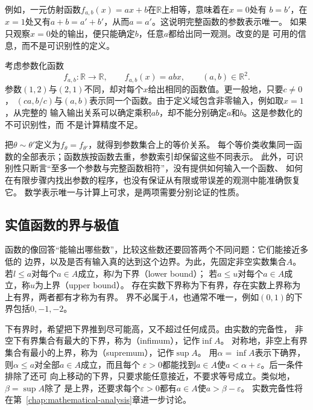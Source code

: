 例如，一元仿射函数$f_{a,b}(x)=ax+b$在$\mathbb{R}$上相等，意味着在$x=0$处有
$b=b'$，在$x=1$处又有$a+b=a'+b'$，从而$a=a'$。这说明完整函数的参数表示唯一。
如果只观察$x=0$处的输出，便只能确定$b$，任意$a$都给出同一观测。改变的是
可用的信息，而不是可识别性的定义。

\begin{example}[参数不同而函数相同]
\label{ex:prelim-nonidentifiable-parameterization}
考虑参数化函数
\[
  f_{a,b}:\mathbb{R}\to\mathbb{R},
  \qquad
  f_{a,b}(x)=abx,
  \qquad
  (a,b)\in\mathbb{R}^2.
\]
参数$(1,2)$与$(2,1)$不同，却对每个$x$给出相同的函数值。更一般地，只要$c\neq0$，
$(ca,b/c)$与$(a,b)$表示同一个函数。由于定义域包含非零输入，例如取$x=1$，从完整的
输入输出关系可以确定乘积$ab$，却不能分别确定$a$和$b$。这是参数化的不可识别性，而
不是计算精度不足。
\end{example}

把$\theta\sim\theta'$定义为$f_\theta=f_{\theta'}$，就得到参数集合上的等价关系。
每个等价类收集同一函数的全部表示；函数族按函数去重，参数索引却保留这些不同表示。
此外，可识别性只断言“至多一个参数与完整函数相符”，没有提供如何输入一个函数、
如何在有限步骤内找出参数的程序，也没有保证从有限或带误差的观测中能准确恢复它。
数学表示唯一与计算上可求，是两项需要分别论证的性质。

\subsection{实值函数的界与极值}
\label{sec:prelim-optimal-values-errors}

函数的像回答“能输出哪些数”，比较这些数还要回答两个不同问题：它们能接近多低的
边界，以及是否有输入真的达到这个边界。为此，先固定非空实数集合$A$。
若$l\leq a$对每个$a\in A$成立，称$l$为下界（lower bound）；
若$a\leq u$对每个$a\in A$成立，称$u$为上界（upper bound）。
存在实数下界称为下有界，存在实数上界称为上有界，两者都有才称为有界。
界不必属于$A$，也通常不唯一，例如$(0,1)$的下界包括$0,-1,-2$。

下有界时，希望把下界推到尽可能高，又不超过任何成员。由实数的完备性，
非空下有界集合有最大的下界，称为（infimum），记作$\inf A$。
对称地，非空上有界集合有最小的上界，称为（supremum），记作$\sup A$。
用$\alpha=\inf A$表示下确界，则$\alpha\leq a$对全部$a\in A$成立，而且每个
$\varepsilon>0$都能找到$a\in A$使$a<\alpha+\varepsilon$。后一条件排除了还可
向上移动的下界，只要求能任意接近，不要求等号成立。类似地，$\beta=\sup A$除了
是上界，还要求每个$\varepsilon>0$都有$a\in A$使$a>\beta-\varepsilon$。
实数完备性将在第~\ref{chap:mathematical-analysis}章进一步讨论。

